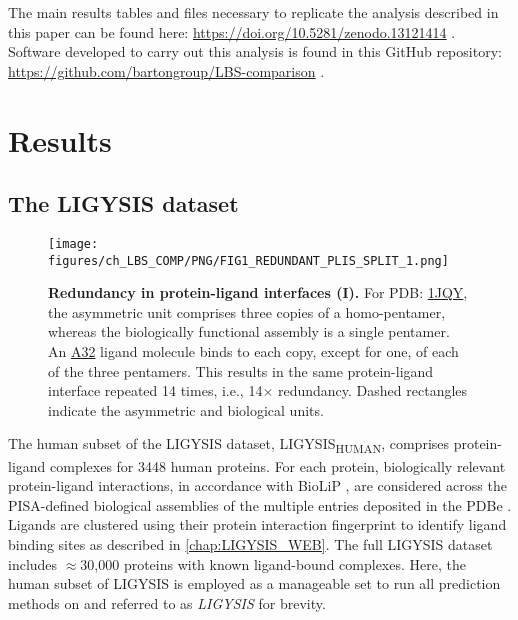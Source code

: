 The main results tables and files necessary to replicate the analysis described in this paper can be found here: \url{https://doi.org/10.5281/zenodo.13121414} \cite{UTGES_2024_LBSCOMP_ZENODO}. Software developed to carry out this analysis is found in this GitHub repository: \url{https://github.com/bartongroup/LBS-comparison} \cite{UTGES_2024_LBSCOMP_REPO}.

\section{Results}

\subsection{The LIGYSIS dataset}

\begin{figure}[htb!]
    \centering
    \texttt{[image: figures/ch\_LBS\_COMP/PNG/FIG1\_REDUNDANT\_PLIS\_SPLIT\_1.png]}
    \caption[Redundancy in protein-ligand interfaces (I)]{\textbf{Redundancy in protein-ligand interfaces (I).} For PDB: \href{https://www.ebi.ac.uk/pdbe/entry/pdb/1jqy}{1JQY}, the asymmetric unit comprises three copies of a homo-pentamer, whereas the biologically functional assembly is a single pentamer. An \href{https://www.ebi.ac.uk/pdbe-srv/pdbechem/chemicalCompound/show/A32}{A32} ligand molecule binds to each copy, except for one, of each of the three pentamers. This results in the same protein-ligand interface repeated 14 times, i.e., 14$\times$ redundancy. Dashed rectangles indicate the asymmetric and biological units.}
    \label{fig:redundant_plis_1}
\end{figure}

The human subset of the LIGYSIS dataset, LIGYSIS\textsubscript{HUMAN}, comprises protein-ligand complexes for 3448 human proteins. For each protein, biologically relevant protein-ligand interactions, in accordance with BioLiP \cite{YANG_2013_BIOLIP}, are considered across the PISA-defined \cite{KRISSINEL_2007_PISA} biological assemblies of the multiple entries deposited in the PDBe \cite{ARMSTRONG_2020_PDBE}. Ligands are clustered using their protein interaction fingerprint to identify ligand binding sites as described in \autoref{chap:LIGYSIS_WEB}. The full LIGYSIS dataset includes $\approx$30,000 proteins with known ligand-bound complexes. Here, the human subset of LIGYSIS is employed as a manageable set to run all prediction methods on and referred to as \textit{LIGYSIS} for brevity.

